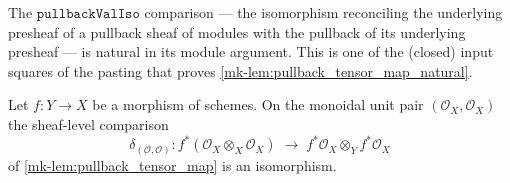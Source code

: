 \begin{lemma}\label{mk-lem:pullback_val_iso_natural}
  \leanok

  The \(\mathtt{pullbackValIso}\) comparison --- the isomorphism reconciling the underlying
  presheaf of a pullback sheaf of modules with the pullback of its underlying presheaf ---
  is natural in its module argument. This is one of the (closed) input squares of the
  pasting that proves \ref{mk-lem:pullback_tensor_map_natural}.
\end{lemma}

\begin{lemma}\label{mk-lem:pullback_tensor_iso_unit}
  \leanok

  Let \(f : Y \to X\) be a morphism of schemes. On the monoidal unit pair
  \((\mathcal{O}_X, \mathcal{O}_X)\) the sheaf-level comparison
  \[
    \delta_{(\mathcal{O},\mathcal{O})} :
      f^*(\mathcal{O}_X \otimes_X \mathcal{O}_X)
      \;\longrightarrow\;
      f^*\mathcal{O}_X \otimes_Y f^*\mathcal{O}_X
  \]
  of \ref{mk-lem:pullback_tensor_map} is an isomorphism.
\end{lemma}

